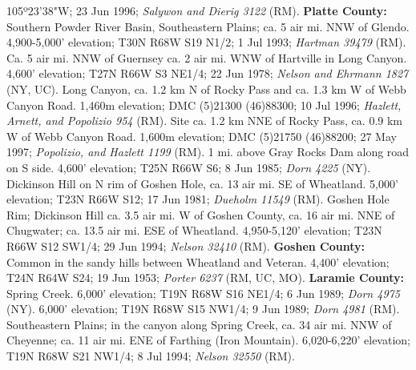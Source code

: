 105º23'38"W; 23 Jun 1996; \textit{Salywon and Dierig 3122} (RM).
  \textbf{Platte County:}
Southern Powder River Basin, Southeastern Plains; ca. 5 air mi. NNW of Glendo.
4,900-5,000' elevation; T30N R68W S19 N1/2; 1 Jul 1993;
\textit{Hartman 39479} (RM).
Ca. 5 air mi. NNW of Guernsey ca. 2 air mi. WNW of Hartville in Long Canyon.
4,600' elevation; T27N R66W S3 NE1/4; 22 Jun 1978;
\textit{Nelson and Ehrmann 1827} (NY, UC).
Long Canyon, ca. 1.2 km N of Rocky Pass and ca. 1.3 km W of Webb Canyon Road.
1,460m elevation; DMC (5)21300 (46)88300; 10 Jul 1996;
\textit{Hazlett, Arnett, and Popolizio 954} (RM).
Site ca. 1.2 km NNE of Rocky Pass, ca. 0.9 km W of Webb Canyon Road.
1,600m elevation; DMC (5)21750 (46)88200; 27 May 1997;
\textit{Popolizio, and Hazlett 1199} (RM).
1 mi. above Gray Rocks Dam along road on S side. 4,600' elevation; T25N R66W S6;
8 Jun 1985; \textit{Dorn 4225} (NY).
Dickinson Hill on N rim of Goshen Hole, ca. 13 air mi. SE of Wheatland.
5,000' elevation; T23N R66W S12; 17 Jun 1981; \textit{Dueholm 11549} (RM).
Goshen Hole Rim; Dickinson Hill ca. 3.5 air mi. W of Goshen County, ca. 16 air
mi. NNE of Chugwater; ca. 13.5 air mi. ESE of Wheatland. 4,950-5,120' elevation;
T23N R66W S12 SW1/4; 29 Jun 1994; \textit{Nelson 32410} (RM).
  \textbf{Goshen County:}
  Common in the sandy hills between Wheatland and Veteran. 4,400' elevation;
  T24N R64W S24; 19 Jun 1953; \textit{Porter 6237} (RM, UC, MO).
  \textbf{Laramie County:}
Spring Creek. 6,000' elevation; T19N R68W S16 NE1/4; 6 Jun 1989;
\textit{Dorn 4975} (NY).
6,000' elevation; T19N R68W S15 NW1/4; 9 Jun 1989; \textit{Dorn 4981} (RM).
Southeastern Plains; in the canyon along Spring Creek, ca. 34 air mi. NNW of
Cheyenne; ca. 11 air mi. ENE of Farthing (Iron Mountain). 6,020-6,220'
elevation; T19N R68W S21 NW1/4; 8 Jul 1994; \textit{Nelson 32550} (RM).
